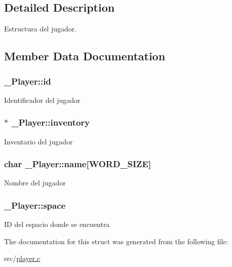 \subsection{Detailed Description}
Estructura del jugador. 

\subsection{Member Data Documentation}
\hypertarget{struct__Player_a60d635cd063816a9c1bd873f4868bb90}{
\subsubsection[{id}]{ \+\_\+\+Player\+::id}}\label{struct__Player_a60d635cd063816a9c1bd873f4868bb90}
Identificador del jugador \hypertarget{struct__Player_a5e02924cb82ca61f74ba414d190aa29b}{
\subsubsection[{inventory}]{$\ast$ \+\_\+\+Player\+::inventory}}\label{struct__Player_a5e02924cb82ca61f74ba414d190aa29b}
Inventario del jugador \hypertarget{struct__Player_adda99df91c28eb58d392f2b43fc6898f}{
\subsubsection[{name}]{\setlength{\rightskip}{0pt plus 5cm}char \+\_\+\+Player\+::name\mbox{[}{\bf W\+O\+R\+D\+\_\+\+S\+I\+Z\+E}\mbox{]}}}\label{struct__Player_adda99df91c28eb58d392f2b43fc6898f}
Nombre del jugador \hypertarget{struct__Player_aada8d7c35cffc55491f24f42d7991b14}{
\subsubsection[{space}]{ \+\_\+\+Player\+::space}}\label{struct__Player_aada8d7c35cffc55491f24f42d7991b14}
I\+D del espacio donde se encuentra 

The documentation for this struct was generated from the following file\+:\begin{DoxyCompactItemize}
\item 
src/\hyperlink{player_8c}{player.\+c}\end{DoxyCompactItemize}
